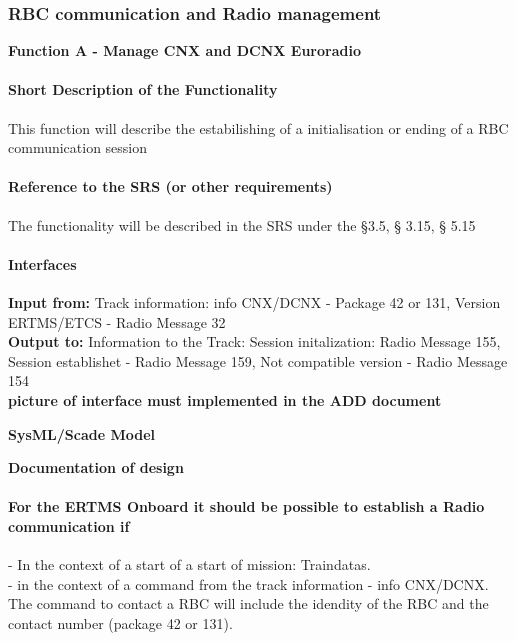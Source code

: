 \documentclass{template/openetcs_report}
\begin{document}
\subsubsection{RBC communication and Radio management}
\textbf{Function A - Manage CNX and DCNX Euroradio}

\paragraph{Short Description of the Functionality}
This function will describe the estabilishing of a initialisation or ending of a RBC communication session\\

\paragraph{Reference to the SRS (or other requirements)}
The functionality will be described in the SRS under the §3.5, § 3.15, § 5.15\\

\paragraph{Interfaces}
\textbf{Input from:} Track information: info CNX/DCNX - Package 42 or 131, Version ERTMS/ETCS - Radio Message 32\\

\textbf{Output to:} Information to the Track: Session initalization: Radio Message 155, Session establishet - Radio Message 159, Not compatible version - Radio Message 154\\

\textbf{picture of interface must implemented in the ADD document}

\textbf{SysML/Scade Model}

\textbf{Documentation of design}

 \paragraph{For the ERTMS Onboard it should be possible to establish a Radio communication if}

- In the context of a start of a start of mission: Traindatas.\\
- in the context of a command from the track information - info CNX/DCNX. The command to contact a RBC will include the idendity of the RBC and the contact number (package 42 or 131).\\
\end{document}
